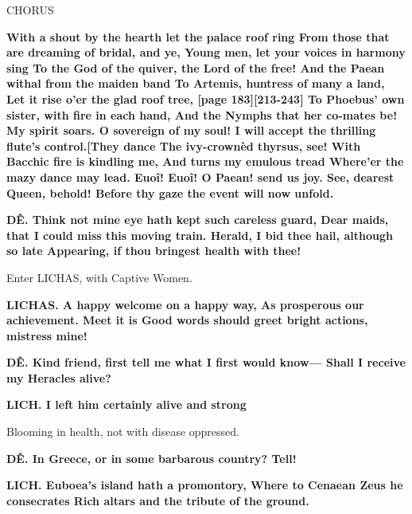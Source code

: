 \documentclass[11pt,letter]{book}
\begin{document}
\par  CHORUS

\par \textbf{With a shout by the hearth let the palace roof ring From those that are dreaming of bridal, and ye, Young men, let your voices in harmony sing To the God of the quiver, the Lord of the free! And the Paean withal from the maiden band To Artemis, huntress of many a land, Let it rise o’er the glad roof tree, [page 183][213-243] To Phoebus’ own sister, with fire in each hand, And the Nymphs that her co-mates be! My spirit soars. O sovereign of my soul! I will accept the thrilling flute’s control.[They dance The ivy-crownèd thyrsus, see! With Bacchic fire is kindling me, And turns my emulous tread Where’er the mazy dance may lead. Euoî! Euoî! O Paean! send us joy. See, dearest Queen, behold! Before thy gaze the event will now unfold.}
\par 

\par \textbf{DÊ. Think not mine eye hath kept such careless guard, Dear maids, that I could miss this moving train. Herald, I bid thee hail, although so late Appearing, if thou bringest health with thee!}
\par 

\par  Enter LICHAS, with Captive Women.

\par \textbf{LICHAS. A happy welcome on a happy way, As prosperous our achievement. Meet it is Good words should greet bright actions, mistress mine!}
\par 

\par \textbf{DÊ. Kind friend, first tell me what I first would know— Shall I receive my Heracles alive?}
\par 

\par \textbf{LICH. I left him certainly alive and strong}
\par   Blooming in health, not with disease oppressed.

\par \textbf{DÊ. In Greece, or in some barbarous country? Tell!}
\par 

\par \textbf{LICH. Euboea’s island hath a promontory, Where to Cenaean Zeus he consecrates Rich altars and the tribute of the ground.}
\par 
\end{document}
